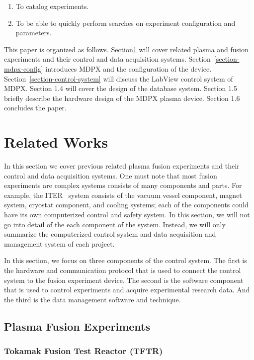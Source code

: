 \begin{enumerate}
\item To catalog experiments.
\item To be able to quickly perform searches on experiment configuration and parameters. 
\end{enumerate}

This paper is organized as follows. Section\ref{section-related-works} will cover related plasma and fusion experiments and their control and data acquisition systems. Section~\ref{section-mdpx-config} introduces MDPX and the configuration of the device. Section~\ref{section-control-system} will discuss the LabView control system of MDPX. Section 1.4 will cover the design of the database system. Section 1.5 briefly describe the hardware design of the MDPX plasma device. Section 1.6 concludes the paper.

\section{Related Works}\label{section-related-works}

In this section we cover previous related plasma fusion experiments and their control and data acquisition systems. One must note that most fusion experiments are complex systems consists of many components and parts. For example, the ITER~\cite{Rebut199585} system consists of the vacuum vessel component, magnet system, cryostat component, and cooling systems; each of the components could have its own computerized control and safety system. In this section, we will not go into detail of the each component of the system. Instead, we will only summarize the computerized control system and data acquisition and management system of each project.

In this section, we focus on three components of the control system. The first is the hardware and communication protocol that is used to connect the control system to the fusion experiment device. The second is the software component that is used to control experiments and acquire experimental research data. And the third is the data management software and technique.


\subsection{Plasma Fusion Experiments}

\subsubsection{Tokamak Fusion Test Reactor (TFTR)}

